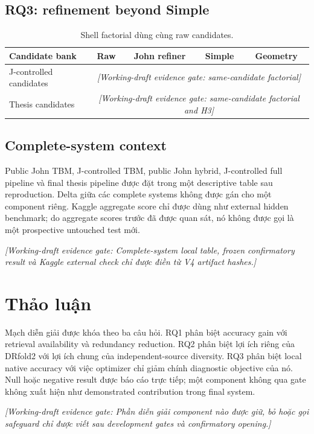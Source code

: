 \documentclass[12pt,a4paper,oneside]{report}
\newcommand{\evidencepending}[1]{\textcolor{evidencegray}{\textit{[Working-draft evidence gate: #1]}}}
\begin{document}
\section{RQ3: refinement beyond Simple}

\begin{table}[H]
\centering
\caption{Shell factorial dùng cùng raw candidates.}
\begin{tabularx}{\textwidth}{Xcccc}
\toprule
Candidate bank & Raw & John refiner & Simple & Geometry \\
\midrule
J-controlled candidates & \multicolumn{4}{c}{\evidencepending{same-candidate factorial}} \\
Thesis candidates & \multicolumn{4}{c}{\evidencepending{same-candidate factorial and H3}} \\
\bottomrule
\end{tabularx}
\end{table}

\section{Complete-system context}

Public John TBM, J-controlled TBM, public John hybrid, J-controlled full pipeline và
final thesis pipeline được đặt trong một descriptive table sau reproduction. Delta
giữa các complete systems không được gán cho một component riêng. Kaggle aggregate
score chỉ được dùng như external hidden benchmark; do aggregate scores trước đã được
quan sát, nó không được gọi là một prospective untouched test mới.

\evidencepending{Complete-system local table, frozen confirmatory result và Kaggle
external check chỉ được điền từ V4 artifact hashes.}

\chapter{Thảo luận}

Mạch diễn giải được khóa theo ba câu hỏi. RQ1 phân biệt accuracy gain với retrieval
availability và redundancy reduction. RQ2 phân biệt lợi ích riêng của DRfold2 với lợi
ích chung của independent-source diversity. RQ3 phân biệt local native accuracy với
việc optimizer chỉ giảm chính diagnostic objective của nó. Null hoặc negative result
được báo cáo trực tiếp; một component không qua gate không xuất hiện như demonstrated
contribution trong final system.

\evidencepending{Phần diễn giải component nào được giữ, bỏ hoặc gọi safeguard chỉ được
viết sau development gates và confirmatory opening.}
\end{document}
